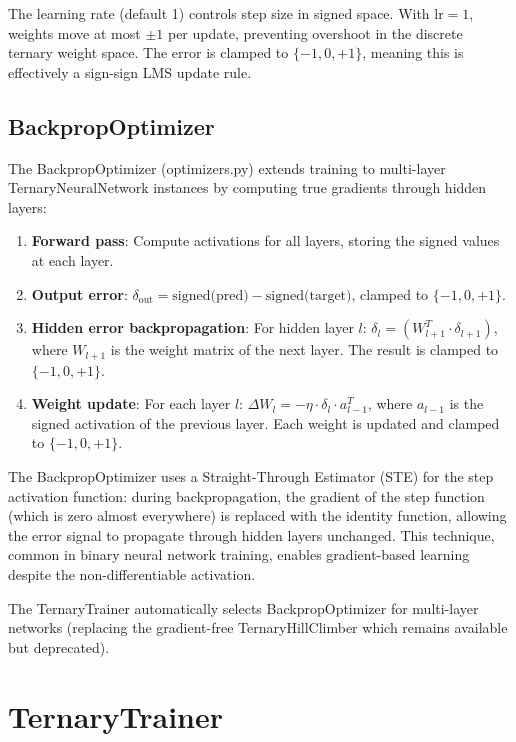 \documentclass[12pt,a4paper,twoside]{book}
\theoremstyle{trinarytheorem}
\theoremstyle{trinarydefinition}
\newcommand{\code}[1]{\textsf{#1}}
\begin{document}
The learning rate (default 1) controls step size in signed space. With
$\text{lr} = 1$, weights move at most $\pm 1$ per update, preventing
overshoot in the discrete ternary weight space. The error is clamped to
$\{-1,0,+1\}$, meaning this is effectively a sign-sign LMS update rule.

\subsection{BackpropOptimizer}

The \code{BackpropOptimizer} (\code{optimizers.py}) extends training to
multi-layer \code{TernaryNeuralNetwork} instances by computing true
gradients through hidden layers:

\begin{enumerate}
    \item \textbf{Forward pass}: Compute activations for all layers,
          storing the signed values at each layer.
    \item \textbf{Output error}: 
          $\delta_{\text{out}} = \text{signed(pred)} - \text{signed(target)}$,
          clamped to $\{-1,0,+1\}$.
    \item \textbf{Hidden error backpropagation}: For hidden layer $l$:
          $\delta_l = (W_{l+1}^T \cdot \delta_{l+1})$, where $W_{l+1}$ is
          the weight matrix of the next layer. The result is clamped to
          $\{-1,0,+1\}$.
    \item \textbf{Weight update}: For each layer $l$:
          $\Delta W_l = -\eta \cdot \delta_l \cdot a_{l-1}^T$, where
          $a_{l-1}$ is the signed activation of the previous layer.
          Each weight is updated and clamped to $\{-1,0,+1\}$.
\end{enumerate}

The BackpropOptimizer uses a Straight-Through Estimator (STE) for the
step activation function: during backpropagation, the gradient of the
step function (which is zero almost everywhere) is replaced with the
identity function, allowing the error signal to propagate through
hidden layers unchanged. This technique, common in binary neural network
training, enables gradient-based learning despite the non-differentiable
activation.

The \code{TernaryTrainer} automatically selects \code{BackpropOptimizer}
for multi-layer networks (replacing the gradient-free
\code{TernaryHillClimber} which remains available but deprecated).

\section{TernaryTrainer}
\end{document}
